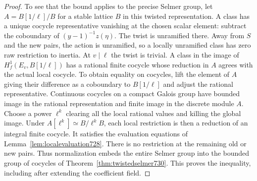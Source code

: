 \documentclass[a4paper,11pt]{article}
\theoremstyle{definition}
\theoremstyle{remark}
\numberwithin{equation}{section}
\begin{document}
\begin{proof}
To see that the bound applies to the precise Selmer group, let
\(A=B[1/\ell]/B\) for a stable lattice \(B\) in this twisted
representation. A class has a unique cocycle representative
vanishing at the chosen scalar element: subtract the coboundary
of \((y-1)^{-1}z(\eta)\). The twist is unramified there.
Away from \(S\) and the new pairs, the action is unramified,
so a locally unramified class has zero raw restriction to inertia.
At \(v\mid\ell\) the twist is trivial. A class in the image of
\(H_f^1(E_v,B[1/\ell])\) has a rational finite cocycle whose
reduction in \(A\) agrees with the actual local cocycle. To
obtain equality on cocycles, lift the element of \(A\) giving
their difference as a coboundary to \(B[1/\ell]\) and adjust
the rational representative. Continuous cocycles on a compact
Galois group have bounded image in the rational representation
and finite image in the discrete module \(A\). Choose a power
\(\ell^k\) clearing all the local rational values and killing the
global image. Under \(A[\ell^k]\simeq B/\ell^kB\), each local
restriction is then a reduction of an integral finite cocycle.
It satisfies the evaluation equations of
Lemma~\ref{lem:localevaluation728}. There is no restriction at
the remaining old or new pairs. Thus normalization embeds the
entire Selmer group into the bounded group of cocycles of
Theorem~\ref{thm:twistedselmer730}. This proves the inequality,
including after extending the coefficient field.
\end{proof}
\end{document}
